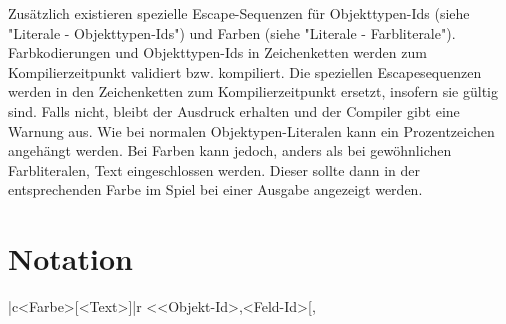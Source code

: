 Zusätzlich existieren spezielle Escape-Sequenzen für Objekttypen-Ids (siehe "Literale - Objekttypen-Ids") und Farben (siehe "Literale - Farbliterale").
Farbkodierungen und Objekttypen-Ids in Zeichenketten werden zum Kompilierzeitpunkt validiert bzw. kompiliert.
Die speziellen Escapesequenzen werden in den Zeichenketten zum Kompilierzeitpunkt ersetzt, insofern sie gültig sind.
Falls nicht, bleibt der Ausdruck erhalten und der Compiler gibt eine Warnung aus.
Wie bei normalen Objektypen-Literalen kann ein Prozentzeichen angehängt werden.
Bei Farben kann jedoch, anders als bei gewöhnlichen Farbliteralen, Text eingeschlossen werden. Dieser sollte dann in der entsprechenden Farbe
im Spiel bei einer Ausgabe angezeigt werden.

\section{Notation}
|c<Farbe>[<Text>]|r
<<Objekt-Id>,<Feld-Id>[, %
